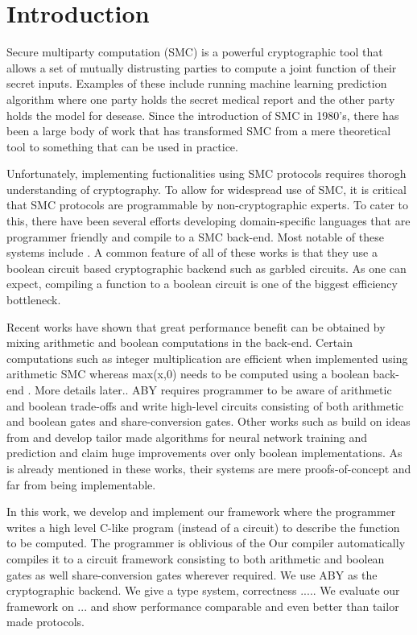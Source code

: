 \section{Introduction}
\label{sec:intro}

Secure multiparty computation \cite{yao,gmw} (SMC) is a powerful cryptographic tool that allows a set of mutually distrusting parties to compute a joint function of their secret inputs. Examples of these include running machine learning prediction algorithm where one party holds the secret medical report and the other party holds the model for desease. Since the introduction of SMC in 1980's, there has been a large body of work \cite{..} that has transformed SMC from a mere theoretical tool to something that can be used in practice. 

Unfortunately, implementing fuctionalities using SMC protocols requires thorogh understanding of cryptography. To allow for widespread use of SMC, it is critical that SMC protocols are programmable by non-cryptographic experts. To cater to this, there have been several efforts developing domain-specific languages that are programmer friendly and compile to a SMC back-end. Most notable of these systems include \cite{...}. A common feature of all of these works is that they use a boolean circuit based cryptographic backend such as garbled circuits. As one can expect, compiling a function to a boolean circuit is one of the biggest efficiency bottleneck. 

Recent works \cite{aby,secureml,minion} have shown that great performance benefit can be obtained by mixing arithmetic and boolean computations in the back-end. Certain computations such as integer multiplication are efficient when implemented using arithmetic SMC \cite{gmw} whereas max(x,0) needs to be computed using a boolean back-end \cite{yao}. More details later.. ABY \cite{aby} requires programmer to be aware of arithmetic and boolean trade-offs and  write high-level circuits consisting of both arithmetic and boolean gates and share-conversion gates. Other works such as \cite{secureml,minion} build on ideas from \cite{aby} and develop tailor made algorithms for neural network training and prediction \cite{ml} and claim huge improvements over only boolean implementations. As is already mentioned in these works, their systems are mere proofs-of-concept and far from being implementable.

In this work, we develop and implement our framework \tool where the programmer writes a high level C-like program (instead of a circuit) to describe the function to be computed. The programmer is oblivious of the Our compiler automatically compiles it to a circuit framework consisting to both arithmetic and boolean gates as well share-conversion gates wherever required. We use ABY as the cryptographic backend. We give a type system, correctness ..... We evaluate our framework on ... and show performance comparable and even better than tailor made protocols. 



\cite{lambdaps,wysteria}